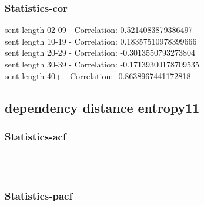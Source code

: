 \documentclass{article}%
\begin{document}
%
\newpage%
\subsubsection{Statistics{-}cor}%
\label{ssubsec:Statistics{-}cor}%
\noindent%
sent length 02-09 - Correlation: 0.5214083879386497\\%
sent length 10-19 - Correlation: 0.18357510978399666\\%
sent length 20-29 - Correlation: -0.3013550793273804\\%
sent length 30-39 - Correlation: -0.17139300178709535\\%
sent length 40+ - Correlation: -0.8638967441172818\\

%
\newpage

%
\subsection{dependency distance entropy11}%
\label{subsec:dependencydistanceentropy11}%
\subsubsection{Statistics{-}acf}%
\label{ssubsec:Statistics{-}acf}%


\begin{figure}[ht]%
\centering%
\setlength{\abovecaptionskip}{-35pt}%
%
%
\\%
%
%
\\%
%
\end{figure}

%
\newpage%
\subsubsection{Statistics{-}pacf}%
\label{ssubsec:Statistics{-}pacf}%
\end{document}
